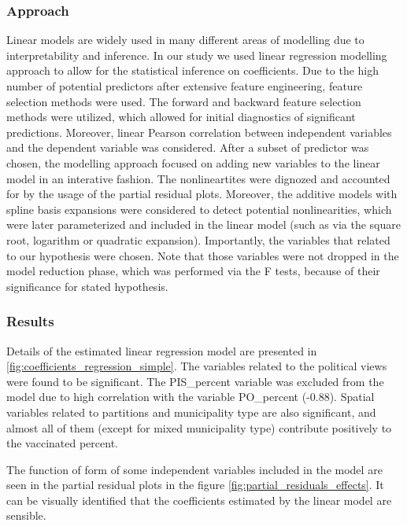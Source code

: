 \documentclass[a4paper,12pt]{article} %
\begin{document}
\subsubsection{Approach}
Linear models are widely used in many different areas of modelling due to interpretability and inference. In our study we used linear regression modelling approach to allow for the statistical inference on coefficients. Due to the high number of potential predictors after extensive feature engineering, feature selection methods were used. The forward and backward feature selection methods were utilized, which allowed for initial diagnostics of significant predictions. Moreover, linear Pearson correlation between independent variables and the dependent variable was considered. After a subset of predictor was chosen, the modelling approach focused on adding new variables to the linear model in an interative fashion. The nonlineartites were dignozed and accounted for by the usage of the partial residual plots. Moreover, the additive models with spline basis expansions were considered to detect potential nonlinearities, \cite{wood2017generalized} which were later parameterized and included in the linear model (such as via the square root, logarithm or quadratic expansion). Importantly, the variables that related to our hypothesis were chosen. Note that those variables were not dropped in the model reduction phase, which was performed via the F tests, because of their significance for stated hypothesis. 

\subsubsection{Results}

Details of the estimated linear regression model are presented in \ref{fig:coefficients_regression_simple}. The variables related to the political views were found to be significant. The PIS\_percent variable was excluded from the model due to high correlation with the variable PO\_percent (-0.88). Spatial variables related to partitions and municipality type are also significant, and almost all of them (except for mixed municipality type) contribute positively to the vaccinated percent.

The function of form of some independent variables included in the model are seen in the partial residual plots in the figure \ref{fig:partial_residuals_effects}. It can be visually identified that the coefficients estimated by the linear model are sensible.
\end{document}

